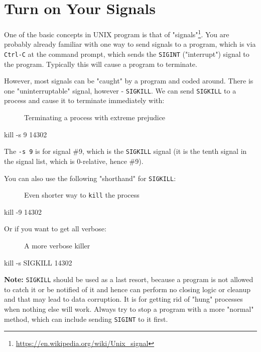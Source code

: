 \documentclass[10pt,american,]{book}
\newenvironment{Shaded}{\begin{snugshade}}{\end{snugshade}}
\newcommand{\KeywordTok}[1]{\textcolor[rgb]{0.13,0.29,0.53}{\textbf{{#1}}}}
\newcommand{\NormalTok}[1]{{#1}}
\renewcommand{\href}[2]{#2\footnote{\url{#1}}}
\numberwithin{figure}{chapter}
\DeclareRobustCommand{\drcap}[1]{\begin{figure}[H]\caption{#1}\end{figure}}
\renewcommand{\KeywordTok}[1]{{#1}}
\renewcommand{\NormalTok}[1]{{#1}}
\begin{document}
\section*{Turn on Your Signals}\label{turn-on-your-signals}

One of the basic concepts in UNIX program is that of
\href{https://en.wikipedia.org/wiki/Unix_signal}{"signals"}.
You are probably already familiar with one way to send signals to a
program, which is via \texttt{Ctrl-C} at the command prompt, which sends
the \texttt{SIGINT} ("interrupt") signal to the program. Typically this
will cause a program to terminate.

However, most signals can be "caught" by a program and coded around.
There is one "uninterruptable" signal, however - \texttt{SIGKILL}. We
can send \texttt{SIGKILL} to a process and cause it to terminate
immediately with:

\drcap{Terminating a process with extreme prejudice}

\begin{Shaded}
\begin{Highlighting}[]
\KeywordTok{kill} \NormalTok{-s 9 14302}
\end{Highlighting}
\end{Shaded}

The \texttt{-s\ 9} is for signal \#9, which is the \texttt{SIGKILL}
signal (it is the tenth signal in the signal list, which is 0-relative,
hence \#9).

You can also use the following "shorthand" for \texttt{SIGKILL}:

\drcap{Even shorter way to \texttt{kill} the process}

\begin{Shaded}
\begin{Highlighting}[]
\KeywordTok{kill} \NormalTok{-9 14302}
\end{Highlighting}
\end{Shaded}

Or if you want to get all verbose:

\drcap{A more verbose killer}

\begin{Shaded}
\begin{Highlighting}[]
\KeywordTok{kill} \NormalTok{-s SIGKILL 14302}
\end{Highlighting}
\end{Shaded}

\textbf{Note:} \texttt{SIGKILL} should be used as a last resort, because
a program is not allowed to catch it or be notified of it and hence can
perform no closing logic or cleanup and that may lead to data
corruption. It is for getting rid of "hung" processes when nothing else
will work. Always try to stop a program with a more "normal" method,
which can include sending \texttt{SIGINT} to it first.
\end{document}
